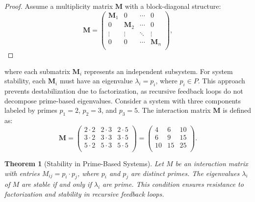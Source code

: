 \documentclass{article}
\theoremstyle{plain}
\newtheorem{theorem}{Theorem}
\begin{document}
\begin{proof}
Assume a multiplicity matrix \( \mathbf{M} \) with a block-diagonal structure:
\begin{equation}
\mathbf{M} = 
\begin{pmatrix}
\mathbf{M}_1 & 0 & \cdots & 0 \\
0 & \mathbf{M}_2 & \cdots & 0 \\
\vdots & \vdots & \ddots & \vdots \\
0 & 0 & \cdots & \mathbf{M}_n \\
\end{pmatrix},
\end{equation}
\end{proof}
where each submatrix \( \mathbf{M}_i \) represents an independent subsystem. For system stability, each \( \mathbf{M}_i \) must have an eigenvalue \( \lambda_i = p_i \), where \( p_i \in P \). This approach prevents destabilization due to factorization, as recursive feedback loops do not decompose prime-based eigenvalues.
Consider a system with three components labeled by primes \( p_1 = 2 \), \( p_2 = 3 \), and \( p_3 = 5 \). The interaction matrix \( \mathbf{M} \) is defined as:
\begin{equation}
\mathbf{M} = 
\begin{pmatrix}
2 \cdot 2 & 2 \cdot 3 & 2 \cdot 5 \\
3 \cdot 2 & 3 \cdot 3 & 3 \cdot 5 \\
5 \cdot 2 & 5 \cdot 3 & 5 \cdot 5 \\
\end{pmatrix} = 
\begin{pmatrix}
4 & 6 & 10 \\
6 & 9 & 15 \\
10 & 15 & 25 \\
\end{pmatrix}.
\end{equation}
\begin{theorem}[Stability in Prime-Based Systems]
Let $M$ be an interaction matrix with entries $M_{ij} = p_i \cdot p_j$, where $p_i$ and $p_j$ are distinct primes. The eigenvalues $\lambda_i$ of $M$ are stable if and only if $\lambda_i$ are prime. This condition ensures resistance to factorization and stability in recursive feedback loops.
\end{theorem}
\end{document}
